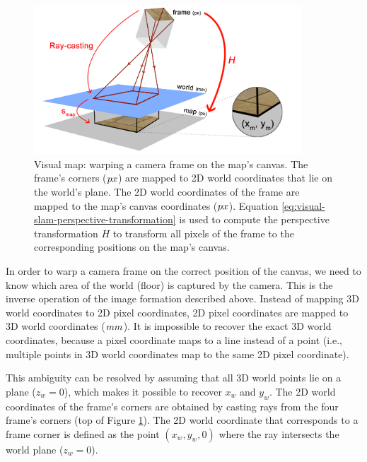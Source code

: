 \begin{figure}[htb]
\centering
\includegraphics[width=10cm]{images/mapping1.png}
\caption{Visual map: warping a camera frame on the map's canvas. The frame's corners ($\small{px}$) are mapped to 2D world coordinates that lie on the world's plane. The 2D world coordinates of the frame are mapped to the map's canvas coordinates ($\small{px}$). Equation \ref{eq:visual-slam-perspective-transformation} is used to compute the perspective transformation $H$ to transform all pixels of the frame to the corresponding positions on the map's canvas.}
\label{fig:mapping2}
\end{figure}

In order to warp a camera frame on the correct position of the canvas, we need to know which area of the world (floor) is captured by the camera.
This is the inverse operation of the image formation described above.
Instead of mapping 3D world coordinates to 2D pixel coordinates, 2D pixel coordinates are mapped to 3D world coordinates ($\small{mm}$).
It is impossible to recover the exact 3D world coordinates, because a pixel coordinate maps to a line instead of a point (i.e., multiple points in 3D world coordinates map to the same 2D pixel coordinate).

This ambiguity can be resolved by assuming that all 3D world points lie on a plane ($z_w = 0$), which makes it possible to recover $x_w$ and $y_w$.
The 2D world coordinates of the frame's corners are obtained by casting rays from the four frame's corners (top of Figure \ref{fig:mapping2}).
The 2D world coordinate that corresponds to a frame corner is defined as the point $(x_w,  y_w , 0)$ where the ray intersects the world plane ($z_w = 0$).

